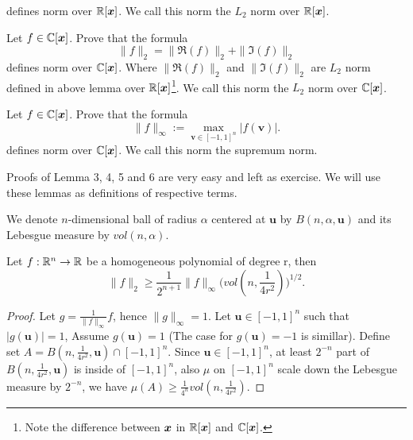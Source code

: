 {\begin{lemma}
$$$$
defines norm over $\mathbb{R}[\bm x]$. We call this norm the $L_2$ norm over $\mathbb{R}[\bm x]$. 
\end{lemma}
\begin{lemma}
Let $f\in \mathbb{C}[\bm x]$. Prove that the formula 
$$
\|f\|_2 = \|\Re(f)\|_2+\|\Im(f)\|_2
$$
defines norm over $\mathbb{C}[\bm x]$. Where $\|\Re(f)\|_2$ and $\|\Im(f)\|_2$ are $L_2$ norm defined in above lemma over $\mathbb{R}[\bm x]$\footnote{Note the difference between $\bm x$ in $\mathbb{R}[\bm x]$ and $\mathbb{C}[\bm x]$.}. We call this norm the $L_2$ norm over $\mathbb{C}[\bm x]$.
\end{lemma}
\begin{lemma}
Let $f\in \mathbb{C}[\bm x]$. Prove that the formula
$$
\|f\|_{\infty} := \max_{\bm v\in[-1,1]^n}|f(\bm v)|.
$$
defines norm over $\mathbb{C}[\bm x]$. We call this norm the supremum norm.
\end{lemma}
\npara
Proofs of Lemma 3, 4, 5 and 6 are very easy and left as exercise. We will use these lemmas as definitions of respective terms.

We denote $n$-dimensional ball of radius $\alpha$ centered at $\bm u$ by $B(n,\alpha,\bm u)$ and its Lebesgue measure by $vol(n,\alpha)$.
\begin{theorem}
Let $f:\mathbb{R}^n \to \mathbb{R}$ be a homogeneous polynomial of degree r, then
$$
\|f\|_2 \ge \frac{1}{2^{n+1}}\|f\|_\infty\Big(vol(n,\frac{1}{4r^2})\Big)^{1/2}.
$$
\end{theorem}
\begin{proof}
Let $g = \frac{1}{\|f\|_\infty}f$, hence $\|g\|_\infty=1$. Let $\bm u\in[-1,1]^n$ such that $|g(\bm u)|=1$, Assume $g(\bm u)=1$ (The case for $g(\bm u)=-1$ is simillar). Define set $A = B(n,\frac{1}{4r^2},\bm u) \cap [-1,1]^n$. Since $\bm u\in[-1,1]^n$, at least $2^{-n}$ part of $B(n,\frac{1}{4r^2},\bm u)$ is inside of $[-1,1]^n$, also $\mu$ on $[-1,1]^n$ scale down the Lebesgue measure by $2^{-n}$, we have $\mu(A)\ge \frac{1}{4^n}vol(n,\frac{1}{4r^2})$.


\end{proof}}
